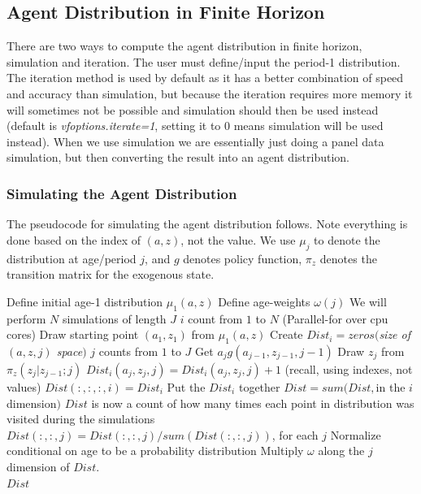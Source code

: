 \subsection{Agent Distribution in Finite Horizon}
There are two ways to compute the agent distribution in finite horizon, simulation and iteration. The user must define/input the period-1 distribution. The iteration method is used by default as it has a better combination of speed and accuracy than simulation, but because the iteration requires more memory it will sometimes not be possible and simulation should then be used instead (default is \textit{vfoptions.iterate=1}, setting it to 0 means simulation will be used instead). When we use simulation we are essentially just doing a panel data simulation, but then converting the result into an agent distribution.


\subsubsection{Simulating the Agent Distribution}
The pseudocode for simulating the agent distribution follows. Note everything is done based on the index of $(a,z)$, not the value. We use $\mu_j$ to denote the distribution at age/period $j$, and $g$ denotes policy function, $\pi_z$ denotes the transition matrix for the exogenous state.
\begin{algorithmic}
 \State Define initial age-1 distribution $\mu_1(a,z)$
 \State Define age-weights $\omega(j)$
 \State We will perform $N$ simulations of length $J$
 \For $i$ count from $1$ to $N$ (Parallel-for over cpu cores)
  \State Draw starting point $(a_1,z_1)$ from $\mu_1(a,z)$
  \State Create $Dist_i=zeros($\textit{size of $(a,z,j)$ space}$)$
  \For $j$ counts from $1$ to $J$
   \State Get $a_jg(a_{j-1},z_{j-1},j-1)$
   \State Draw $z_j$ from $\pi_z(z_j|z_{j-1};j)$
  \EndFor
  \State $Dist_i(a_j, z_j,j)=Dist_i(a_j, z_j,j)+1$ (recall, using indexes, not values)
 \EndFor
 \State $Dist(:,:,:,i)=Dist_i$ \Comment Put the $Dist_i$ together
 \State $Dist=sum(Dist,$in the $i$ dimension$)$
 \Comment $Dist$ is now a count of how many times each point in distribution was visited during the simulations
 \State $Dist(:,:,j)=Dist(:,:,j)/sum(Dist(:,:,j))$, for each $j$
 \Comment Normalize conditional on age to be a probability distribution
 \State Multiply $\omega$ along the $j$ dimension of $Dist$.
 \\ \Return $Dist$
\end{algorithmic}

